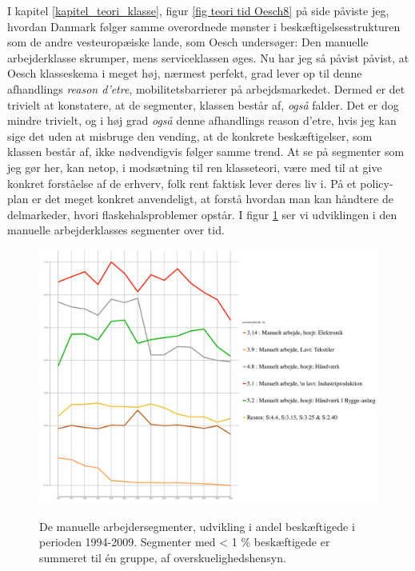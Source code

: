 I kapitel \ref{kapitel_teori_klasse}, figur \ref{fig teori tid Oesch8} på side \pageref{fig teori tid Oesch8} påviste jeg, hvordan Danmark følger samme overordnede mønster i beskæftigelsesstrukturen som de andre vesteuropæiske lande, som Oesch undersøger: Den manuelle arbejderklasse skrumper, mens serviceklassen øges. Nu har jeg så påvist påvist, at Oesch klasseskema i meget høj, nærmest perfekt, grad lever op til denne afhandlings \emph{reason d'etre}, mobilitetsbarrierer på arbejdsmarkedet. Dermed er det trivielt at konstatere, at de segmenter, klassen består af, \emph{også} falder. Det er dog mindre trivielt, og i høj grad \emph{også} denne afhandlings reason d'etre, hvis jeg kan sige det uden at misbruge den vending, at de konkrete beskæftigelser, som klassen består af, ikke nødvendigvis følger samme trend. At se på segmenter som jeg gør her, kan netop, i modsætning til ren klasseteori, være med til at give konkret forståelse af de erhverv, folk rent faktisk lever deres liv i. På et policy-plan er det meget konkret anvendeligt, at forstå hvordan man kan håndtere de delmarkeder, hvori flaskehalsproblemer opstår. I figur \ref{fig delanalyse3 klasse tid manueltsegment} ser vi udviklingen i den manuelle arbejderklasses segmenter over tid. 

%
   \begin{figure}[H]
   \begin{centering}
    \caption[Tidsserie: De manuelle arbejdersegmenter]{De manuelle arbejdersegmenter, udvikling i andel beskæftigede i perioden 1994-2009. Segmenter med < 1 \% beskæftigede er summeret til én gruppe, af overskuelighedshensyn.} %
    \includegraphics[width=\textwidth]{fig/tidsserier/tid_seg_manuelt.pdf}
    \label{fig delanalyse3 klasse tid manueltsegment}
   \end{centering}
   \end{figure}   
%

